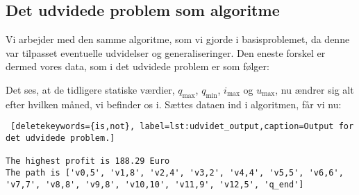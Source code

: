 \subsection{Det udvidede problem som algoritme}
Vi arbejder med den samme algoritme, som vi gjorde i basisproblemet, da denne var tilpasset eventuelle udvidelser og generaliseringer. Den eneste forskel er dermed vores data, som i det udvidede problem er som følger:

 

Det ses, at de tidligere statiske værdier, $q_{\max}$, $q_{\min}$, $i_{\max}$ og $u_{\max}$, nu ændrer sig alt efter hvilken måned, vi befinder os i. Sættes dataen ind i algoritmen, får vi nu:


\begin{lstlisting} [deletekeywords={is,not}, label=lst:udvidet_output,caption=Output for det udvidede problem.]

The highest profit is 188.29 Euro
The path is ['v0,5', 'v1,8', 'v2,4', 'v3,2', 'v4,4', 'v5,5', 'v6,6', 'v7,7', 'v8,8', 'v9,8', 'v10,10', 'v11,9', 'v12,5', 'q_end']

\end{lstlisting}